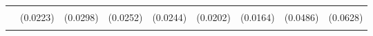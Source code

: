 \begin{table}[!h]
\begin{tabular}[t]{lllllllll}
\addlinespace
\cellcolor{gray!10}{WSLS} & \cellcolor{gray!10}{0.0009} & \cellcolor{gray!10}{0.0437} & \cellcolor{gray!10}{0.0550*} & \cellcolor{gray!10}{0.0310} & \cellcolor{gray!10}{0.0165} & \cellcolor{gray!10}{0.0122} & \cellcolor{gray!10}{0.1160*} & \cellcolor{gray!10}{0.1092}\\
 & (0.0223) & (0.0298) & (0.0252) & (0.0244) & (0.0202) & (0.0164) & (0.0486) & (0.0628)\\
\cellcolor{gray!10}{T2} & \cellcolor{gray!10}{0.1926***} & \cellcolor{gray!10}{0.1001} & \cellcolor{gray!10}{0.0155} & \cellcolor{gray!10}{0.0000} & \cellcolor{gray!10}{0.0000} & \cellcolor{gray!10}{0.0249} & \cellcolor{gray!10}{0.0429} & \cellcolor{gray!10}{0.1037}\\
\bottomrule
\end{tabular}
\end{table}